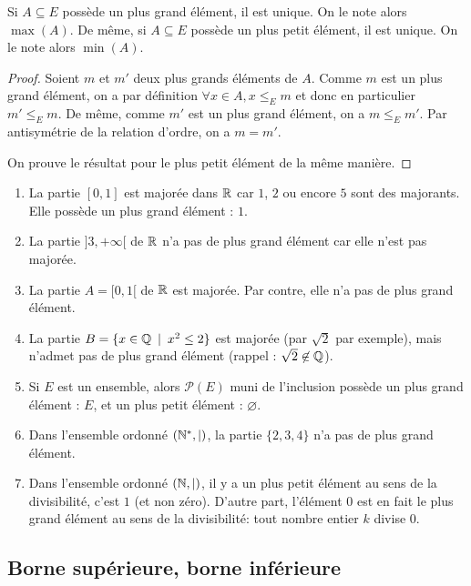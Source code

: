 \begin{proposition}
Si $A\subseteq E$ possède un plus grand élément, il est unique. On le note alors $\max(A)$.
De même, si $A\subseteq E$ possède un plus petit élément, il est unique. On le note alors $\min(A)$.
\end{proposition}
\begin{proof}
Soient $m$ et $m'$ deux plus grands éléments de $A$. Comme $m$ est un plus grand élément, on a par définition $\forall x\in A, x\leq_E m$ et donc en particulier $m'\leq_E m$. De même, comme $m'$ est un plus grand élément, on a $m\leq_E m'$. Par antisymétrie de la relation d'ordre, on a $m=m'$.

On prouve le résultat pour le plus petit élément de la même manière.
\end{proof}

\begin{exemples}
\begin{enumerate}[label=\alph*)]
\item  La partie $[0,1]$ est majorée dans $\mathbb{R}$ car $1$, $2$ ou encore $5$ sont des majorants. Elle possède un plus grand élément : $1$.
\item La partie $]3,+\infty[$ de $\mathbb{R}$ n'a pas de plus grand élément car elle n'est pas majorée.
\item La partie $A=[0,1[$ de $\mathbb{R}$ est majorée. Par contre, elle n'a pas de plus grand élément. 
\item La partie $B=\{x\in \mathbb{Q}\:\mid\: x^2\leq 2\}$ est majorée (par $\sqrt2$ par exemple), mais n'admet pas de plus grand élément (rappel : $\sqrt 2 \not\in\mathbb{Q}$).
\item Si $E$ est un ensemble, alors $\mathcal P(E)$ muni de l'inclusion possède un plus grand élément : $E$, et un plus petit élément : $\varnothing$.
\item Dans l'ensemble ordonné $(\mathbb{N}^*,|)$, la partie $\{2,3,4\}$ n'a pas de plus grand élément.
\item Dans l'ensemble ordonné $(\mathbb{N},|)$, il y a un plus petit élément au sens de la divisibilité, c'est $1$ (et non zéro). D'autre part, l'élément $0$ est en fait le plus grand élément au sens de la divisibilité: tout nombre entier $k$ divise $0$.
\end{enumerate}
\end{exemples}

\subsection{Borne supérieure, borne inférieure}


